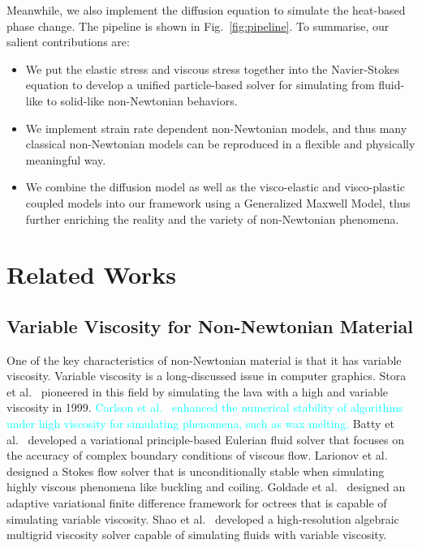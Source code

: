 \documentclass[10pt,journal,compsoc]{IEEEtran}
\newcommand{\revised}[1]{{\textcolor{cyan}{#1}}}
\begin{document}
Meanwhile, we also implement the diffusion equation to simulate the heat-based phase change. The pipeline is shown in Fig.~\ref{fig:pipeline}. To summarise, our salient contributions are:

\begin{itemize}
	\item We put the elastic stress and viscous stress together into the Navier-Stokes equation to develop a unified particle-based solver for simulating from fluid-like to solid-like non-Newtonian behaviors.
	\item We implement strain rate dependent non-Newtonian models, and thus many classical non-Newtonian models can be reproduced in a flexible and physically meaningful way.
	\item We combine the diffusion model as well as the visco-elastic and visco-plastic coupled models into our framework using a Generalized Maxwell Model, thus further enriching the reality and the variety of non-Newtonian phenomena.
\end{itemize}



\section{Related Works}


\subsection{Variable Viscosity for Non-Newtonian Material}
One of the key characteristics of non-Newtonian material is that it has variable viscosity. Variable viscosity is a long-discussed issue in computer graphics. Stora et al.~\cite{Stora1999} pioneered in this field by simulating the lava with a high and variable viscosity in 1999. \revised{Carlson et al.~\cite{Carlson2002} enhanced the numerical stability of algorithms under high viscosity for simulating phenomena, such as wax melting.} Batty et al.~\cite{Batty2008-accurate-viscous} developed a variational principle-based Eulerian fluid solver that focuses on the accuracy of complex boundary conditions of viscous flow. Larionov et al.~\cite{Larionov2017-variationalStokes} designed a Stokes flow solver that is unconditionally stable when simulating highly viscous phenomena like buckling and coiling. Goldade et al.~\cite{Goldade2019-Adaptive-Octree-Viscosity} designed an adaptive variational finite difference framework for octrees that is capable of simulating variable viscosity.  Shao et al.~\cite{Shao-Huang2022-unsmoothed} developed a high-resolution algebraic multigrid viscosity solver capable of simulating fluids with variable viscosity.
\end{document}
